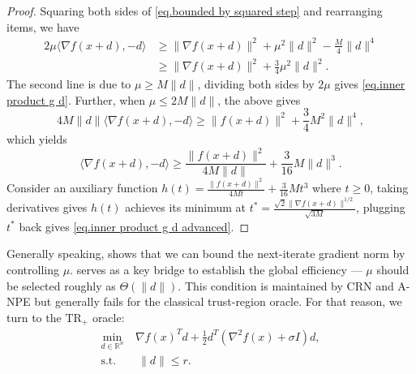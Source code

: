 \documentclass{mcom-l}
\newcommand{\trp}{\textrm{TR}_+}
\numberwithin{equation}{section}
\begin{document}
\begin{proof}
    Squaring both sides of \eqref{eq.bounded by squared step} and rearranging items, we have
    \begin{equation*}
        \begin{aligned}
            2\mu \langle \nabla f(x+d),-d \rangle & \geq \|\nabla f(x+d)\|^2 +\mu^2 \|d\|^2 -\frac{M}{4}\|d\|^4 \\
                                                  & \geq \|\nabla f(x+d)\|^2 +\frac{3}{4}\mu^2 \|d\|^2.
        \end{aligned}
    \end{equation*}
    The second line is due to $\mu\geq M\|d\|$, dividing both sides by $2\mu$ gives \eqref{eq.inner product g d}. Further, when $\mu \leq 2M\|d\|$, the above gives
    \begin{equation*}
        4M\|d\| \langle \nabla f(x+d),-d \rangle \geq \|f(x+d)\|^2 +\frac{3}{4} M^2 \|d\|^4,
    \end{equation*}
    which yields
    \begin{equation*}
        \langle \nabla f(x+d),-d \rangle \geq \frac{\|f(x+d)\|^2}{4M\|d\|}+\frac{3}{16}M\|d\|^3.
    \end{equation*}
    Consider an auxiliary function $h(t) = \frac{\|f(x+d)\|^2}{4Mt}+\frac{3}{16}Mt^3$ where $t\geq 0$, taking derivatives gives $h(t)$ achieves its minimum at $t^*= \frac{\sqrt{2}\|\nabla f(x+d)\|^{1/2}}{\sqrt{3M}}$, plugging $t^*$ back gives \eqref{eq.inner product g d advanced}.
\end{proof}
Generally speaking,  shows that we can bound the next-iterate gradient norm by controlling $\mu$.
 serves as a key bridge to establish the global efficiency --- $\mu$ should be selected roughly as $\Theta(\|d\|)$. This condition is maintained by CRN and A-NPE but generally fails for the classical trust-region oracle. For that reason, we turn to the $\trp{}$ oracle:
\begin{align*}
    \min_{d \in \mathbb{R}^n}~ & \nabla f(x)^T d + \tfrac{1}{2} d^T (\nabla^2 f(x) + \sigma I) d, \\
    \text{s.t.}                & ~ \|d\|                        \le r.
\end{align*}
\end{document}
